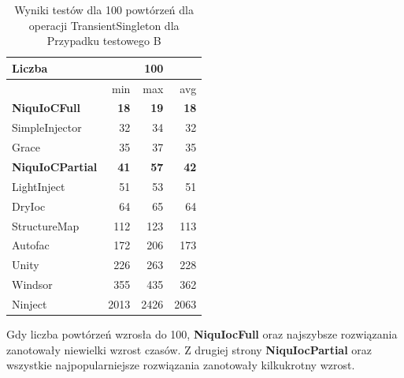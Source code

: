 \documentclass[12pt]{article}
\begin{document}
\begin{table}[H]
\captionsetup{belowskip=0pt,aboveskip=0pt}
\begin{center}
\begin{small}
	\begin{tabular}{ | l | r r r | }
    		\hline
Liczba & & 100 & \\ \hline
 & min & max & avg \\ \hline
\textbf{NiquIoCFull} & \textbf{18} & \textbf{19} & \textbf{18} \\ \hline
SimpleInjector & 32 & 34 & 32 \\ \hline
Grace & 35 & 37 & 35 \\ \hline
\textbf{NiquIoCPartial} & \textbf{41} & \textbf{57} & \textbf{42} \\ \hline
LightInject & 51 & 53 & 51 \\ \hline
DryIoc & 64 & 65 & 64 \\ \hline
StructureMap & 112 & 123 & 113 \\ \hline
Autofac & 172 & 206 & 173 \\ \hline
Unity & 226 & 263 & 228 \\ \hline
Windsor & 355 & 435 & 362 \\ \hline
Ninject & 2013 & 2426 & 2063 \\ \hline
  	\end{tabular}
\end{small}
\end{center}
\caption{Wyniki testów dla 100 powtórzeń dla operacji TransientSingleton dla Przypadku testowego B}
\label{TestCaseB_TransientSingleton100}
\end{table}
Gdy liczba powtórzeń wzrosła do 100, \textbf{NiquIocFull} oraz najszybsze rozwiązania zanotowały niewielki wzrost czasów. Z drugiej strony \textbf{NiquIocPartial} oraz wszystkie najpopularniejsze rozwiązania zanotowały kilkukrotny wzrost.
\\ \\
\end{document}
